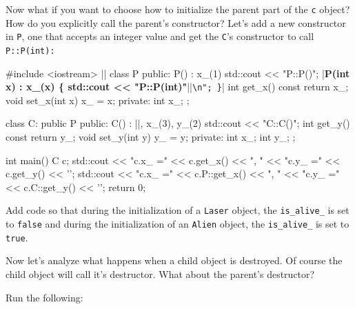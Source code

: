Now what if you want to choose how to initialize the parent part of the
\verb!c! object? How do you explicitly call the parent's constructor?
Let's add a new constructor in \verb!P!, one that accepts an integer
value and get the \verb!C!'s constructor to call \verb!P::P(int):!
\begin{consolethree}[escapeinside=||]
#include <iostream>
||
class P
{
public:
        P() : x_(1) { std::cout << "P::P()\n"; }
        |\textbf{P(int x) : x\_(x) \{ std::cout << "P::P(int)"}||\verb!\n"; }!|
        int get_x() const { return x_; }
        void set_x(int x) { x_ = x; }
private:
        int x_;
};

class C: public P
{
public:
        C() : ||, x_(3), y_(2)
                     { std::cout << "C::C()"; }
        int get_y() const { return y_; }
        void set_y(int y) { y_ = y; }
private:
        int x_;
        int y_;
};

int main()
{   
    C c;
    std::cout << "c.x_ =" << c.get_x() << ", "
              << "c.y_ =" << c.get_y() << '\n';
    std::cout << "c.x_ =" << c.P::get_x() << ", "
              << "c.y_ =" << c.C::get_y() << '\n';
    return 0;
}
\end{consolethree}

Add code so that during the initialization of a \verb!Laser! object, the
\verb!is_alive_! is set to \verb!false! and during the initialization
of an \verb!Alien! object, the \verb!is_alive_! is set to \verb!true!.

\newpage{}

Now let's analyze what happens when a child object is destroyed. Of
course the child object will call it's destructor. What about the
parent's destructor?

Run the following:

